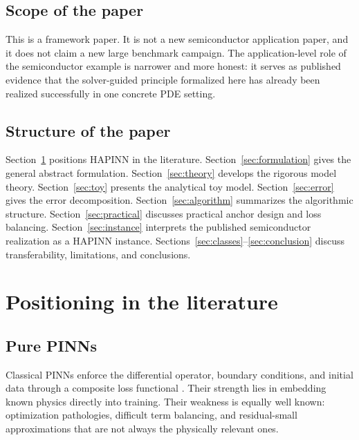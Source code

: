 \documentclass[preprint,12pt]{elsarticle}
\theoremstyle{definition}
\numberwithin{equation}{section}
\begin{document}
\subsection*{Scope of the paper}

This is a framework paper. It is not a new semiconductor application paper, and it does not claim a new large benchmark campaign. The application-level role of the semiconductor example is narrower and more honest: it serves as published evidence that the solver-guided principle formalized here has already been realized successfully in one concrete PDE setting.

\subsection*{Structure of the paper}

Section~\ref{sec:positioning} positions HAPINN in the literature. Section~\ref{sec:formulation} gives the general abstract formulation. Section~\ref{sec:theory} develops the rigorous model theory. Section~\ref{sec:toy} presents the analytical toy model. Section~\ref{sec:error} gives the error decomposition. Section~\ref{sec:algorithm} summarizes the algorithmic structure. Section~\ref{sec:practical} discusses practical anchor design and loss balancing. Section~\ref{sec:instance} interprets the published semiconductor realization as a HAPINN instance. Sections~\ref{sec:classes}--\ref{sec:conclusion} discuss transferability, limitations, and conclusions.

\section{Positioning in the literature}
\label{sec:positioning}

\subsection{Pure PINNs}

Classical PINNs enforce the differential operator, boundary conditions, and initial data through a composite loss functional \cite{Raissi2019,Karniadakis2021}. Their strength lies in embedding known physics directly into training. Their weakness is equally well known: optimization pathologies, difficult term balancing, and residual-small approximations that are not always the physically relevant ones.
\end{document}
